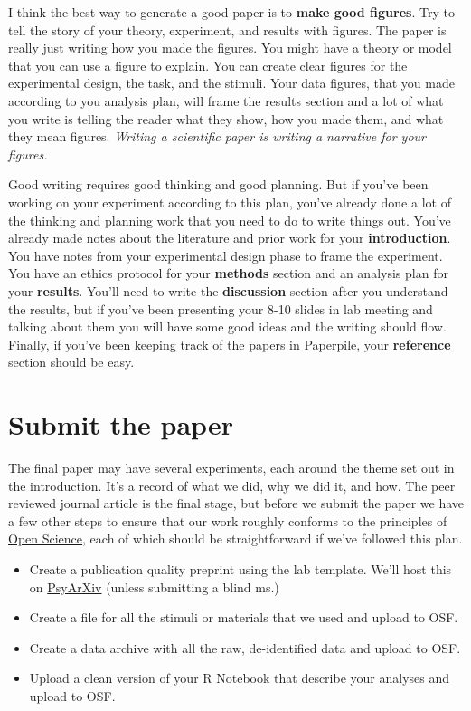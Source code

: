 \documentclass{article}
\begin{document}
I think the best way to generate a good paper is to \textbf{make good figures}. Try to tell the story of your theory, experiment, and results with figures. The paper is really just writing how you made the figures. You might have a theory or model that you can use a figure to explain. You can create clear figures for the experimental design, the task, and the stimuli. Your data figures, that you made according to you analysis plan, will frame the results section and a lot of what you write is telling the reader what they show, how you made them, and what they mean figures. \textit{Writing a scientific paper is writing a narrative for your figures.}

Good writing requires good thinking and good planning. But if you've been working on your experiment according to this plan, you've already done a lot of the thinking and planning work that you need to do to write things out. You've already made notes about the literature and prior work for your \textbf{introduction}. You have notes from your experimental design phase to frame the experiment. You have an ethics protocol for your \textbf{methods} section and an analysis plan for your \textbf{results}. You'll need to write the \textbf{discussion} section after you understand the results, but if you've been presenting your 8-10 slides in lab meeting and talking about them you will have some good ideas and the writing should flow. Finally, if you've been keeping track of the papers in Paperpile, your \textbf{reference} section should be easy.

\section{Submit the paper}
The final paper may have several experiments, each around the theme set out in the introduction. It's a record of what we did, why we did it, and how. The peer reviewed journal article is the final stage, but before we submit the paper we have a few other steps to ensure that our work roughly conforms to the principles of \href{https://jpminda.com/2018/07/12/open-science-my-list-of-best-practices/}{Open Science}, each of which should be straightforward if we've followed this plan.

\begin{itemize}
\item Create a publication quality preprint using the lab template. We'll host this on \href{https://psyarxiv.com/}{PsyArXiv} (unless submitting a blind ms.)  
\item Create a file for all the stimuli or materials that we used and upload to OSF. 
\item Create a data archive with all the raw, de-identified data and upload to OSF.
\item Upload a clean version of your R Notebook that describe your analyses and upload to OSF.
\end{itemize}
\end{document}
